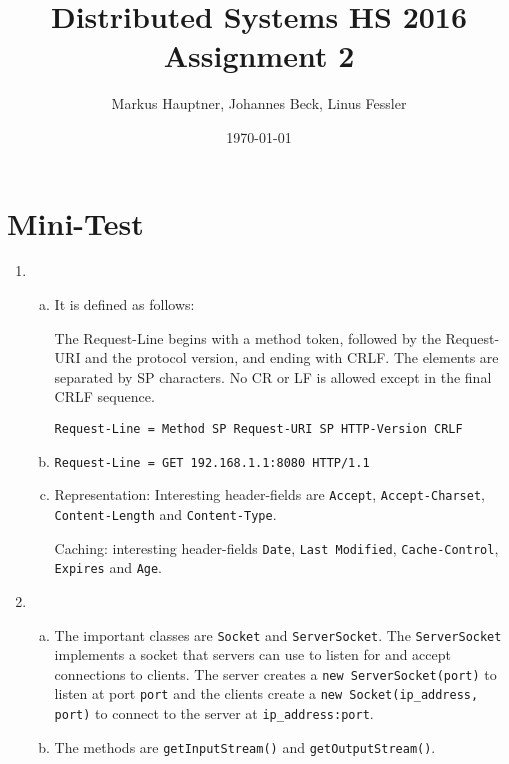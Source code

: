 \documentclass[11pt]{article}
\title{Distributed Systems HS 2016\\Assignment 2}
\author{Markus Hauptner, Johannes Beck, Linus Fessler}
\date{\today}
\begin{document}
\maketitle

\section{Mini-Test}

\begin{enumerate}

\item
\begin{enumerate}[a)]

\item
It is defined as follows:
\begin{displayquote}
The Request-Line begins with a method token, followed by the Request-URI and the protocol version, and ending with CRLF. The elements are separated by SP characters. No CR or LF is allowed except in the final CRLF sequence.

\lstinline{Request-Line = Method SP Request-URI SP HTTP-Version CRLF}
\end{displayquote}

\item
\lstinline{Request-Line = GET 192.168.1.1:8080 HTTP/1.1}

\item
Representation: Interesting header-fields are \lstinline{Accept}, \lstinline{Accept-Charset}, \lstinline{Content-Length} and \lstinline{Content-Type}.

Caching: interesting header-fields \lstinline{Date}, \lstinline{Last Modified}, \lstinline{Cache-Control}, \lstinline{Expires} and \lstinline{Age}.

\end{enumerate}

\item
\begin{enumerate}[a)]

\item
The important classes are \lstinline{Socket} and \lstinline{ServerSocket}. The \lstinline{ServerSocket} implements a socket that servers can use to listen for and accept connections to clients. The server creates a \lstinline{new ServerSocket(port)} to listen at port \lstinline{port} and the clients create a \lstinline{new Socket(ip_address, port)} to connect to the server at \lstinline{ip_address:port}.

\item
The methods are \lstinline{getInputStream()} and \lstinline{getOutputStream()}.


\end{enumerate}
\end{enumerate}
\end{document}

